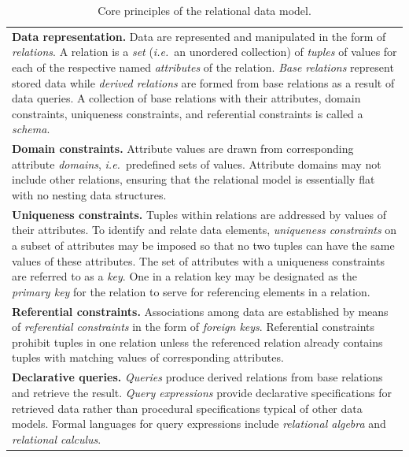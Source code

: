 \documentclass[letter,10pt]{article}
\begin{document}
\tabulinesep=6pt
\begin{table}[ht]
\begin{tabu}{|X|}
\hline
{\bf Data representation.} Data are represented and manipulated in the form of \emph{relations}. 
A relation is a \emph{set} (\emph{i.e.}\ an unordered collection) of \emph{tuples} of values for each of the respective named \emph{attributes} of the relation.
\emph{Base relations} represent stored data while \emph{derived relations} are formed from base relations as a result of data queries.
A collection of base relations with their attributes, domain constraints, uniqueness constraints, and referential constraints is called a \emph{schema}.

\\
{\bf Domain constraints.} Attribute values are drawn from corresponding attribute \emph{domains}, \emph{i.e.}\ predefined sets of values.
Attribute domains may not include other relations, ensuring that the relational model is essentially flat with no nesting data structures.

\\
{\bf Uniqueness constraints.} Tuples within relations are addressed by values of their attributes.
To identify and relate data elements, \emph{uniqueness constraints} on a subset of attributes may be imposed so that no two tuples can have the same values of these attributes.  The set of attributes with a uniqueness constraints are referred to as a \emph{key}. One in a relation key may be designated as the \emph{primary key} for the relation to serve for referencing elements in a relation.

\\
{\bf Referential constraints.} Associations among data are established by means of \emph{referential constraints} in the form of \emph{foreign keys}. 
Referential constraints prohibit tuples in one relation unless the referenced relation already contains tuples with matching values of corresponding attributes. 

\\
{\bf Declarative queries.} \emph{Queries} produce derived relations from base relations and retrieve the result.  
\emph{Query expressions} provide declarative specifications for retrieved data rather than procedural specifications typical of other data models. 
Formal languages for query expressions include \emph{relational algebra} and \emph{relational calculus}.  
\\
\hline
\end{tabu}
\caption{Core principles of the relational data model.}
\label{tab:core}
\end{table}
\end{document}
